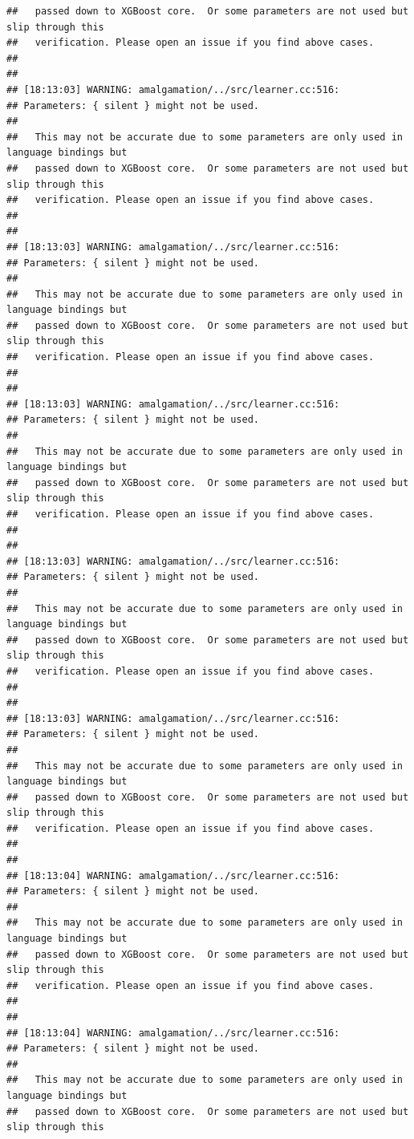 \documentclass[AMS,STIX2COL]{WileyNJD-v2}\usepackage[]{graphicx}\usepackage[]{color}
\makeatletter
\newenvironment{kframe}{%
 \def\at@end@of@kframe{}%
 \ifinner\ifhmode%
  \def\at@end@of@kframe{\end{minipage}}%
  \begin{minipage}{\columnwidth}%
 \fi\fi%
 \def\FrameCommand##1{\hskip\@totalleftmargin \hskip-\fboxsep
 \colorbox{shadecolor}{##1}\hskip-\fboxsep
     \hskip-\linewidth \hskip-\@totalleftmargin \hskip\columnwidth}%
 \MakeFramed {\advance\hsize-\width
   \@totalleftmargin\z@ \linewidth\hsize
   \@setminipage}}%
 {\par\unskip\endMakeFramed%
 \at@end@of@kframe}
\newenvironment{knitrout}{}{} %
\makeatother
\begin{document}
\begin{knitrout}
\begin{kframe}
\begin{verbatim}
##   passed down to XGBoost core.  Or some parameters are not used but slip through this
##   verification. Please open an issue if you find above cases.
## 
## 
## [18:13:03] WARNING: amalgamation/../src/learner.cc:516: 
## Parameters: { silent } might not be used.
## 
##   This may not be accurate due to some parameters are only used in language bindings but
##   passed down to XGBoost core.  Or some parameters are not used but slip through this
##   verification. Please open an issue if you find above cases.
## 
## 
## [18:13:03] WARNING: amalgamation/../src/learner.cc:516: 
## Parameters: { silent } might not be used.
## 
##   This may not be accurate due to some parameters are only used in language bindings but
##   passed down to XGBoost core.  Or some parameters are not used but slip through this
##   verification. Please open an issue if you find above cases.
## 
## 
## [18:13:03] WARNING: amalgamation/../src/learner.cc:516: 
## Parameters: { silent } might not be used.
## 
##   This may not be accurate due to some parameters are only used in language bindings but
##   passed down to XGBoost core.  Or some parameters are not used but slip through this
##   verification. Please open an issue if you find above cases.
## 
## 
## [18:13:03] WARNING: amalgamation/../src/learner.cc:516: 
## Parameters: { silent } might not be used.
## 
##   This may not be accurate due to some parameters are only used in language bindings but
##   passed down to XGBoost core.  Or some parameters are not used but slip through this
##   verification. Please open an issue if you find above cases.
## 
## 
## [18:13:03] WARNING: amalgamation/../src/learner.cc:516: 
## Parameters: { silent } might not be used.
## 
##   This may not be accurate due to some parameters are only used in language bindings but
##   passed down to XGBoost core.  Or some parameters are not used but slip through this
##   verification. Please open an issue if you find above cases.
## 
## 
## [18:13:04] WARNING: amalgamation/../src/learner.cc:516: 
## Parameters: { silent } might not be used.
## 
##   This may not be accurate due to some parameters are only used in language bindings but
##   passed down to XGBoost core.  Or some parameters are not used but slip through this
##   verification. Please open an issue if you find above cases.
## 
## 
## [18:13:04] WARNING: amalgamation/../src/learner.cc:516: 
## Parameters: { silent } might not be used.
## 
##   This may not be accurate due to some parameters are only used in language bindings but
##   passed down to XGBoost core.  Or some parameters are not used but slip through this

\end{verbatim}
\end{kframe}
\end{knitrout}
\end{document}
